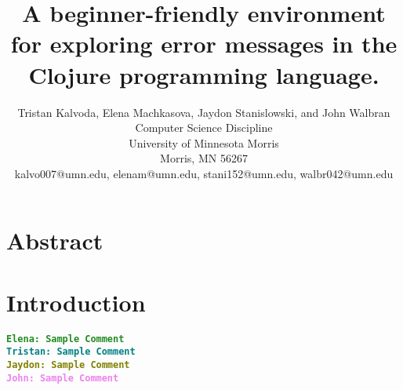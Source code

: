 \documentclass[12pt]{article}
\newcommand{\comment}[1]{{\bf \tt  {#1}}}
\newcommand{\emcomment}[1]{\textcolor{ForestGreen}{\comment{Elena: {#1}}}}
\newcommand{\tkcomment}[1]{\textcolor{Teal}{\comment{Tristan: {#1}}}}
\newcommand{\jscomment}[1]{\textcolor{olive}{\comment{Jaydon: {#1}}}}
\newcommand{\jwcomment}[1]{\textcolor{violet}{\comment{John: {#1}}}}
\begin{document}
\pagestyle{plain}
%

\title{A beginner-friendly environment for exploring error messages in the Clojure programming language.}
%
%

\author{
Tristan Kalvoda, Elena Machkasova, Jaydon Stanislowski, and John Walbran\\
Computer Science Discipline \\
University of Minnesota Morris\\
Morris, MN 56267\\
kalvo007@umn.edu, elenam@umn.edu, stani152@umn.edu, walbr042@umn.edu
}
\date{}
\maketitle
\thispagestyle{empty}

\section*{\centering Abstract}


\newpage
\setcounter{page}{1}

\section{Introduction}

\emcomment{Sample Comment} \\
\tkcomment{Sample Comment} \\
\jscomment{Sample Comment} \\
\jwcomment{Sample Comment}
\end{document}
